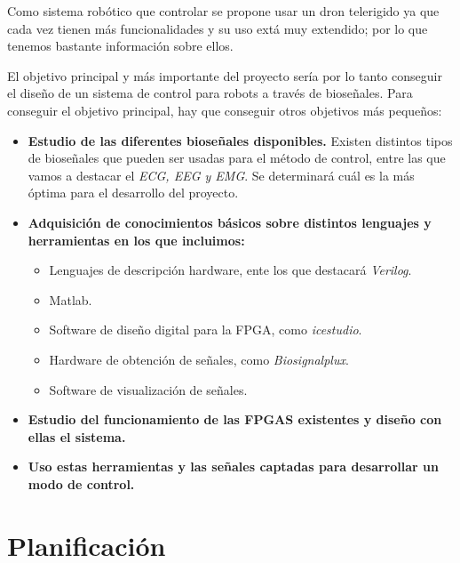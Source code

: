 Como sistema robótico que controlar se propone usar un dron telerigido ya que cada vez tienen más funcionalidades y su uso extá muy extendido; por lo que tenemos bastante información sobre ellos. \newline 

El objetivo principal  y más importante del proyecto sería por lo tanto conseguir el diseño de un sistema de control para robots a través de bioseñales. 
Para conseguir  el objetivo principal, hay que conseguir otros objetivos más pequeños:\newline
\begin{itemize}
\item \textbf{Estudio de las diferentes bioseñales disponibles.} Existen distintos tipos de bioseñales que pueden ser usadas para el método de control, entre las que vamos a destacar el \textit{ECG, EEG y EMG}. Se determinará cuál es la más óptima para el desarrollo del proyecto. 

\item \textbf{Adquisición de conocimientos básicos sobre distintos lenguajes y herramientas en los que incluimos:}

	\begin{itemize}
  		\item Lenguajes de descripción hardware, ente los que destacará \textit{Verilog}.
		\item Matlab.
		\item Software de diseño digital para la FPGA, como \textit{icestudio}.
		\item Hardware de obtención de señales, como \textit{Biosignalplux}.
		\item Software de visualización de señales.
	\end{itemize} 

\item \textbf{Estudio del funcionamiento de las FPGAS existentes y diseño con ellas el sistema.}

\item \textbf{Uso estas herramientas y las señales captadas para desarrollar un modo de control.}
\end{itemize} 

\section{Planificación}

